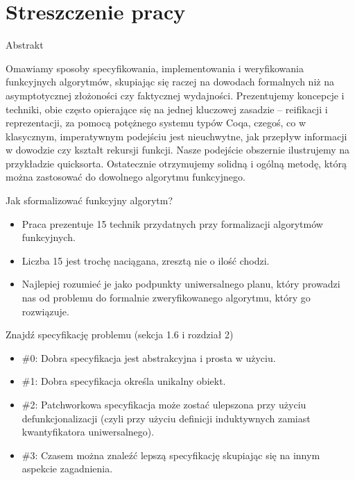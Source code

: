 \documentclass{beamer}
\begin{document}
\section{Streszczenie pracy}

\begin{frame}{Abstrakt}
\begin{center}
	Omawiamy sposoby specyfikowania, implementowania i weryfikowania funkcyjnych algorytmów, skupiając się raczej na dowodach formalnych niż na asymptotycznej złożoności czy faktycznej wydajności. Prezentujemy koncepcje i techniki, obie często opierające się na jednej kluczowej zasadzie -- reifikacji i reprezentacji, za pomocą potężnego systemu typów Coqa, czegoś, co w klasycznym, imperatywnym podejściu jest nieuchwytne, jak przepływ informacji w dowodzie czy kształt rekursji funkcji. Nasze podejście obszernie ilustrujemy na przykładzie quicksorta. Ostatecznie otrzymujemy solidną i ogólną metodę, którą można zastosować do dowolnego algorytmu funkcyjnego.
\end{center}
\end{frame}

\begin{frame}{Jak sformalizować funkcyjny algorytm?}
\begin{itemize}
	\item Praca prezentuje 15 technik przydatnych przy formalizacji algorytmów funkcyjnych.
	\item Liczba 15 jest trochę naciągana, zresztą nie o ilość chodzi.
	\item Najlepiej rozumieć je jako podpunkty uniwersalnego planu, który prowadzi nas od problemu do formalnie zweryfikowanego algorytmu, który go rozwiązuje.
\end{itemize}
\end{frame}

\begin{frame}{Znajdź specyfikację problemu (sekcja 1.6 i rozdział 2)}
\begin{itemize}
	\item \#0: Dobra specyfikacja jest abstrakcyjna i prosta w użyciu.
	\item \#1: Dobra specyfikacja określa unikalny obiekt.
	\item \#2: Patchworkowa specyfikacja może zostać ulepszona przy użyciu defunkcjonalizacji (czyli przy użyciu definicji induktywnych zamiast kwantyfikatora uniwersalnego).
	\item \#3: Czasem można znaleźć lepszą specyfikację skupiając się na innym aspekcie zagadnienia.
\end{itemize}
\end{frame}
\end{document}
